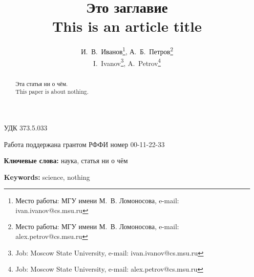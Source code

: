 

\title{
	Это заглавие \\
	This is an article title
}

\author{
	И.~В.~Иванов\footnote{
		Место работы: МГУ имени М.~В. Ломоносова,
		e-mail: ivan.ivanov@cs.msu.ru
	},
	А.~Б.~Петров\footnote{
		Место работы: МГУ имени М.~В. Ломоносова,
		e-mail: alex.petrov@cs.msu.ru
	}\\
	I.~Ivanov\footnote{
		Job: Moscow State University,
		e-mail: ivan.ivanov@cs.msu.ru
	},
	A.~Petrov\footnote{
		Job: Moscow State University,
		e-mail: alex.petrov@cs.msu.ru
	}
}

\date{}

\maketitle


УДК 373.5.033

Работа поддержана грантом РФФИ номер 00-11-22-33

\begin{abstract}
	Эта статья ни о чём.\\
	This paper is about nothing.
\end{abstract}


\textbf{Ключевые слова:} наука, статья ни о чём

\textbf{Keywords:} science, nothing

